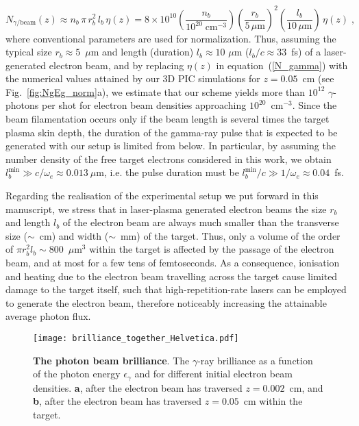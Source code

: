 \documentclass[fleqn,11pt]{wlscirep}
\begin{document}
\begin{equation}\label{N_gamma}
N_{\gamma/\text{beam}}(z) \approx
n_b\,\pi\, r_b^2\,l_b\,\eta(z) =
8\times10^{10}\left(\frac{n_b}{10^{20}\;\text{cm}^{-3}}\right)
\left(\frac{r_b}{5\,\mu\text{m}}\right)^2
\left(\frac{l_b}{10\,\mu\text{m}}\right)\,\eta(z)\;,
\end{equation}
where conventional parameters are used for normalization. Thus, assuming the typical size $r_b\approx5$~$\mu$m and length (duration) $l_b\approx10$ $\mu$m ($l_b/c\approx33$~fs) of a laser-generated electron beam, and by replacing $\eta(z)$ in equation~(\ref{N_gamma}) with the numerical values attained by our 3D PIC simulations for $z=0.05$~cm (see Fig.~\ref{fig:NgEg_norm}a), we estimate that our scheme yields more than $10^{12}$ $\gamma$-photons per shot for electron beam densities approaching $10^{20}$~cm$^{-3}$.  Since the beam filamentation occurs only if the beam length is several times the target plasma skin depth, the duration of the gamma-ray pulse that is expected to be generated with our setup is limited from below. In particular, by assuming the number density of the free target electrons considered in this work, we obtain $l_b^\text{min} \gg c/\omega_e \approx 0.013~\mu$m, i.e. the pulse duration must be $l_b^\text{min} / c \gg 1/ \omega_e \approx 0.04$~fs.


Regarding the realisation of the experimental setup we put forward in this manuscript, we stress that in laser-plasma generated electron beams the size $r_b$ and length $l_b$ of the electron beam are always much smaller than the transverse size ($\sim$~cm) and width ($\sim$~mm) of the target. Thus, only a volume of the order of $\pi r_b^2l_b\sim800$~$\mu$m$^3$ within the target is affected by the passage of the electron beam, and at most for a few tens of femtoseconds. As a consequence, ionisation and heating due to the electron beam travelling across the target cause limited damage to the target itself, such that high-repetition-rate lasers can be employed to generate the electron beam, therefore noticeably increasing the attainable average photon flux.  


\begin{figure} %
\centering
\texttt{[image: brilliance\_together\_Helvetica.pdf]}
\caption{{\bf The photon beam brilliance}. The $\gamma$-ray brilliance as a function of the photon energy $\epsilon_\gamma$ and for different initial electron beam densities. \textbf{a}, after the electron beam has traversed $z=0.002$~cm, and \textbf{b}, after the electron beam has traversed $z=0.05$~cm within the target.}
\label{fig:brilliance}
\end{figure}
\end{document}
